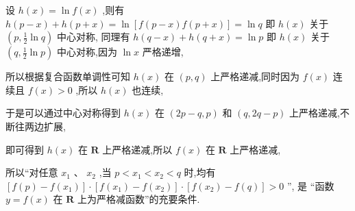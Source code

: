 \documentclass[10pt]{article}
\begin{document}
设 \(h\left( x\right)  = \ln f\left( x\right)\) ,则有 \(h\left( {p - x}\right)  + h\left( {p + x}\right)  = \ln \left\lbrack  {f\left( {p - x}\right) f\left( {p + x}\right) }\right\rbrack   = \ln q\) 即 \(h\left( x\right)\) 关于 \(\left( {p,\frac{1}{2}\ln q}\right)\) 中心对称, 同理有 \(h\left( {q - x}\right)  + h\left( {q + x}\right)  = \ln p\) 即 \(h\left( x\right)\) 关于 \(\left( {q,\frac{1}{2}\ln p}\right)\) 中心对称,因为 \(\ln x\) 严格递增,

所以根据复合函数单调性可知 \(h\left( x\right)\) 在 \(\left( {p,q}\right)\) 上严格递减,同时因为 \(f\left( x\right)\) 连续且 \(f\left( x\right)  > 0\) ,所以 \(h\left( x\right)\) 也连续,

于是可以通过中心对称得到 \(h\left( x\right)\) 在 \(\left( {{2p} - q,p}\right)\) 和 \(\left( {q,{2q} - p}\right)\) 上严格递减,不断往两边扩展,

即可得到 \(h\left( x\right)\) 在 \(\mathbf{R}\) 上严格递减,所以 \(f\left( x\right)\) 在 \(\mathbf{R}\) 上严格递减,

所以“对任意 \({x}_{1}\text{ 、 }{x}_{2}\) ,当 \(p < {x}_{1} < {x}_{2} < q\) 时,均有 \(\left\lbrack  {f\left( p\right)  - f\left( {x}_{1}\right) }\right\rbrack   \cdot  \left\lbrack  {f\left( {x}_{1}\right)  - f\left( {x}_{2}\right) }\right\rbrack   \cdot  \left\lbrack  {f\left( {x}_{2}\right)  - f\left( q\right) }\right\rbrack   > 0\) ”, 是 “函数 \(y = f\left( x\right)\) 在 \(\mathbf{R}\) 上为严格减函数”的充要条件.
\end{document}
